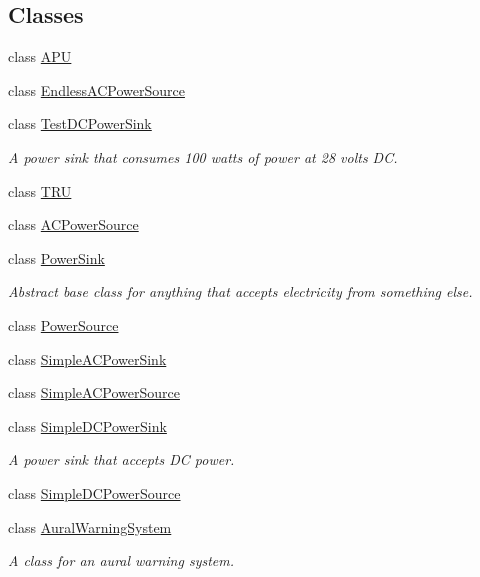 \subsection*{Classes}
\begin{DoxyCompactItemize}
\item 
class \hyperlink{class_challenger604_systems_1_1_a_p_u}{A\-P\-U}
\item 
class \hyperlink{class_challenger604_systems_1_1_endless_a_c_power_source}{Endless\-A\-C\-Power\-Source}
\item 
class \hyperlink{class_challenger604_systems_1_1_test_d_c_power_sink}{Test\-D\-C\-Power\-Sink}
\begin{DoxyCompactList}\small\item\em A power sink that consumes 100 watts of power at 28 volts D\-C. \end{DoxyCompactList}\item 
class \hyperlink{class_challenger604_systems_1_1_t_r_u}{T\-R\-U}
\item 
class \hyperlink{class_challenger604_systems_1_1_a_c_power_source}{A\-C\-Power\-Source}
\item 
class \hyperlink{class_challenger604_systems_1_1_power_sink}{Power\-Sink}
\begin{DoxyCompactList}\small\item\em Abstract base class for anything that accepts electricity from something else. \end{DoxyCompactList}\item 
class \hyperlink{class_challenger604_systems_1_1_power_source}{Power\-Source}
\item 
class \hyperlink{class_challenger604_systems_1_1_simple_a_c_power_sink}{Simple\-A\-C\-Power\-Sink}
\item 
class \hyperlink{class_challenger604_systems_1_1_simple_a_c_power_source}{Simple\-A\-C\-Power\-Source}
\item 
class \hyperlink{class_challenger604_systems_1_1_simple_d_c_power_sink}{Simple\-D\-C\-Power\-Sink}
\begin{DoxyCompactList}\small\item\em A power sink that accepts D\-C power. \end{DoxyCompactList}\item 
class \hyperlink{class_challenger604_systems_1_1_simple_d_c_power_source}{Simple\-D\-C\-Power\-Source}
\item 
class \hyperlink{class_challenger604_systems_1_1_aural_warning_system}{Aural\-Warning\-System}
\begin{DoxyCompactList}\small\item\em A class for an aural warning system. \end{DoxyCompactList}\end{DoxyCompactItemize}
